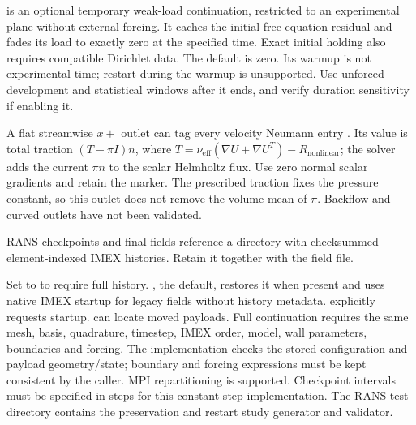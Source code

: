  is an optional temporary weak-load continuation,
restricted to an experimental plane without external forcing. It caches the
initial free-equation residual and fades its load to exactly zero at the
specified time. Exact initial holding also requires compatible Dirichlet data.
The default is zero. Its warmup is not experimental time; restart during the
warmup is unsupported. Use unforced development and statistical windows after
it ends, and verify duration sensitivity if enabling it.

A flat streamwise $x+$ outlet can tag every velocity Neumann entry
. Its value is total traction $(T-\pi I)n$, where
$T=\nu_{\mathrm{eff}}(\nabla U+\nabla U^T)-R_{\mathrm{nonlinear}}$; the solver adds the
current $\pi n$ to the scalar Helmholtz flux. Use zero normal scalar gradients
and retain the  marker. The prescribed traction fixes the
pressure constant, so this outlet does not remove the volume mean of $\pi$.
Backflow and curved outlets have not been validated.

RANS checkpoints and final fields reference a  directory
with checksummed element-indexed IMEX histories. Retain it together with the
field file.

Set  to  to require full history.
, the default, restores it when present and uses native IMEX
startup for legacy fields without history metadata.  explicitly
requests startup.  can locate moved payloads. Full
continuation requires the same mesh, basis, quadrature, timestep, IMEX order,
model, wall parameters, boundaries and forcing. The implementation checks the
stored configuration and payload geometry/state; boundary and forcing
expressions must be kept consistent by the caller. MPI repartitioning is
supported. Checkpoint intervals must be specified in steps for this
constant-step implementation. The RANS test directory contains the preservation
and restart study generator and validator.

